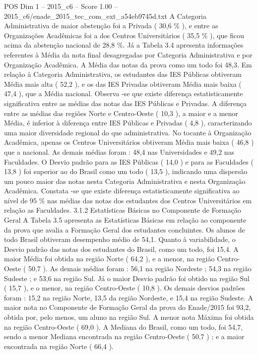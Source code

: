 \begin{textsample}{POS Dim 1 – 2015\_c6 – Score 1.00 – 2015\_c6/enade\_2015\_tec\_com\_ext\_a54eb9745d.txt}
A Categoria Administrativa de maior abstenção foi a Privada ( 30,6 \% ), e entre as Organizações Acadêmicas foi a dos Centros Universitários ( 35,5 \% ), que ficou acima da abstenção nacional de 28,8 \%.
Já a Tabela 3.4 apresenta informações referentes à Média da nota final desagregadas por Categoria Administrativa e por Organização Acadêmica.
A Média das notas da prova como um todo foi 48,3.
Em relação à Categoria Administrativa, os estudantes das IES Públicas obtiveram Média mais alta ( 52,2 ), e os das IES Privadas obtiveram Média mais baixa ( 47,4 ), que a Média nacional.
Observa -se que existe diferença estatisticamente significativa entre as médias das notas das IES Públicas e Privadas.
A diferença entre as médias das regiões Norte e Centro-Oeste ( 10,3 ), a maior e a menor Média, é inferior à diferença entre IES Públicas e Privadas ( 4,8 ), caracterizando uma maior diversidade regional do que administrativa.
No tocante à Organização Acadêmica, apenas os Centros Universitários obtiveram Média mais baixa ( 46,8 ) que a nacional.
As demais médias foram : 48,4 nas Universidades e 49,2 nas Faculdades.
O Desvio padrão para as IES Públicas ( 14,0 ) e para as Faculdades ( 13,8 ) foi superior ao do Brasil como um todo ( 13,5 ), indicando uma dispersão um pouco maior das notas nesta Categoria Administrativa e nesta Organização Acadêmica.
Constata -se que existe diferença estatisticamente significativa ao nível de 95 \% nas médias das notas dos estudantes dos Centros Universitários em relação as Faculdades. 3.1.2 Estatísticas Básicas no Componente de Formação Geral A Tabela 3.5 apresenta as Estatísticas Básicas em relação ao componente da prova que avalia a Formação Geral dos estudantes concluintes.
Os alunos de todo Brasil obtiveram desempenho médio de 54,1.
Quanto à variabilidade, o Desvio padrão das notas dos estudantes do Brasil, como um todo, foi 15,4.
A maior Média foi obtida na região Norte ( 64,2 ), e a menor, na região Centro-Oeste ( 50,7 ).
As demais médias foram : 56,1 na região Nordeste ; 54,3 na região Sudeste ; e 53,6 na região Sul.
Já o maior Desvio padrão foi obtido na região Sul ( 15,7 ), e o menor, na região Centro-Oeste ( 10,8 ).
Os demais desvios padrões foram : 15,2 na região Norte, 13,5 da região Nordeste, e 15,4 na região Sudeste.
A maior nota no Componente de Formação Geral da prova do Enade/2015 foi 93,2, obtida por, pelo menos, um aluno na região Sul.
A menor nota Máxima foi obtida na região Centro-Oeste ( 69,0 ).
A Mediana do Brasil, como um todo, foi 54,7, sendo a menor Mediana encontrada na região Centro-Oeste ( 50,7 ) ; e a maior encontrada na região Norte ( 66,4 ).

\end{textsample}
